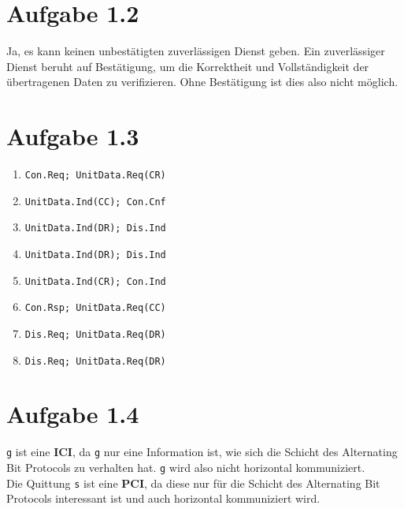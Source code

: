 \documentclass[12pt, a4paper]{article}
\begin{document}
\newpage


\section*{Aufgabe 1.2}
Ja, es kann keinen unbestätigten zuverlässigen Dienst geben. Ein zuverlässiger Dienst beruht auf Bestätigung, um die Korrektheit und Vollständigkeit der übertragenen Daten zu verifizieren. Ohne Bestätigung ist dies also nicht möglich.





\section*{Aufgabe 1.3}
\begin{enumerate}[label=(\arabic*)]
	\item \verb|Con.Req; UnitData.Req(CR)|
	\item \verb|UnitData.Ind(CC); Con.Cnf|
	\item \verb|UnitData.Ind(DR); Dis.Ind|
	\item \verb|UnitData.Ind(DR); Dis.Ind|
	\item \verb|UnitData.Ind(CR); Con.Ind|
	\item \verb|Con.Rsp; UnitData.Req(CC)|
	\item \verb|Dis.Req; UnitData.Req(DR)|
	\item \verb|Dis.Req; UnitData.Req(DR)|
\end{enumerate}





\section*{Aufgabe 1.4}
\verb|g| ist eine \textbf{ICI}, da \verb|g| nur eine Information ist, wie sich die Schicht des Alternating Bit Protocols zu verhalten hat. \verb|g| wird also nicht horizontal kommuniziert.\\
Die Quittung \verb|s| ist eine \textbf{PCI}, da diese nur für die Schicht des Alternating Bit Protocols interessant ist und auch horizontal kommuniziert wird.


\newpage
\end{document}

